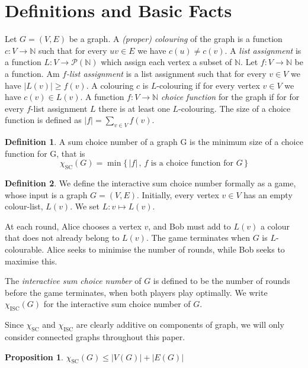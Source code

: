 \documentclass[11pt,a4paper]{article}
\theoremstyle{plain}
\newtheorem{prop}[thm]{Proposition}
\theoremstyle{definition}
\newtheorem{defn}{Definition}[section]
\theoremstyle{remark}
\newcommand{\scn}{\chi_\text{SC}}
\newcommand{\iscn}{\chi_\text{ISC}}
\begin{document}
\section{Definitions and Basic Facts}

Let $G=(V,E)$ be a graph. A \emph{(proper) colouring} of the graph is a function $c:V\rightarrow \mathbb{N}$ such that for every $uv\in E$ we have $c(u) \neq c(v)$. A \emph{list assignment} is a function $L:V\rightarrow \mathcal{P}(\mathbb{N})$ which assign each vertex a subset of $\mathbb{N}$. Let $f: V\rightarrow \mathbb{N}$ be a function. Am \emph{$f$-list assignment} is a list assignment such that for every $v\in V$ we have $|L(v)| \geq f(v)$. A colouring $c$ is $L$-colouring if for every vertex $v\in V$ we have $c(v)\in L(v)$. A function $f: V\rightarrow \mathbb{N}$ \emph{choice function} for the graph if for for every $f$-list assignment $L$ there is at least one $L$-colouring. The size of a choice function is defined as $|f|=\sum_{v\in V} f(v)$. 

\begin{defn}
A sum choice number of a graph G is the minimum size of a choice function for G, that is
$$\chi_\text{SC}(G) = \min\{\, |f|\,,\, f \text{ is a choice function for } G \,\}$$
\end{defn}



\begin{defn}
We define the interactive sum choice number formally as a game, whose input is a graph
$G = (V, E)$. Initially, every vertex $v \in V$ has an empty colour-list, $L(v)$. We set $L : v \mapsto L(v)$.

At each round, Alice chooses a vertex $v$, and Bob must add to $L(v)$ a colour that does
not already belong to $L(v)$. The game terminates when $G$ is $L$-colourable. Alice seeks to
minimise the number of rounds, while Bob seeks to maximise this.

The \emph{interactive sum choice number} of $G$ is defined to be the number of rounds before the
game terminates, when both players play optimally. We write $\iscn(G)$ for the interactive
sum choice number of $G$.
\end{defn}

Since $\scn$ and $\iscn$ are clearly additive on components of graph, we will only consider connected graphs throughout this paper.

\begin{prop}
$\scn(G) \leq |V(G)|+|E(G)|$
\end{prop}
\end{document}

